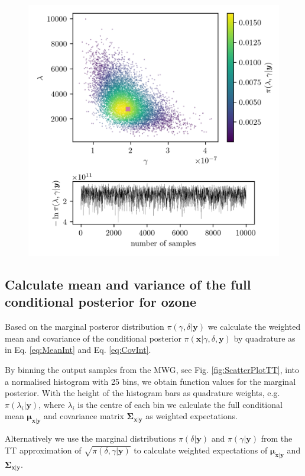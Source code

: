 \begin{figure}[ht!]
	\centering
	\includegraphics{ScatterplusHistoPlusTT.png}
	\caption[]{}
	\label{fig:UwerrMargFirst}
\end{figure}

\subsection{Calculate mean and variance of the full conditional posterior for ozone}
\label{subsec:firstCond}
Based on the marginal posteror distribution $\pi(\gamma, \delta | \bm{y})$ we calculate the weighted mean and covariance of the conditional posterior $\pi(\bm{x} | \gamma, \delta, \bm{y})$ by quadrature as in Eq. \ref{eq:MeanInt} and Eq. \ref{eq:CovInt}.

By binning the output samples from the MWG, see Fig. \ref{fig:ScatterPlotTT}, into a normalised histogram with 25 bins, we obtain function values for the marginal posterior.
With the height of the histogram bars as quadrature weights, e.g. $\pi(\lambda_i| \bm{y})$, where $\lambda_i$ is the centre of each bin we calculate the full conditional mean $\bm{\mu}_{\bm{x}|\bm{y}}$ and covariance matrix $\bm{\Sigma}_{\bm{x}|\bm{y}}$ as weighted expectations.

Alternatively we use the marginal distributions $\pi(\delta | \bm{y})$ and $\pi(\gamma | \bm{y})$ from the TT approximation of $\sqrt{\pi(\delta, \gamma | \bm{y})}$ to calculate 
weighted expectations of $\bm{\mu}_{\bm{x}|\bm{y}}$ and $\bm{\Sigma}_{\bm{x}|\bm{y}}$.

